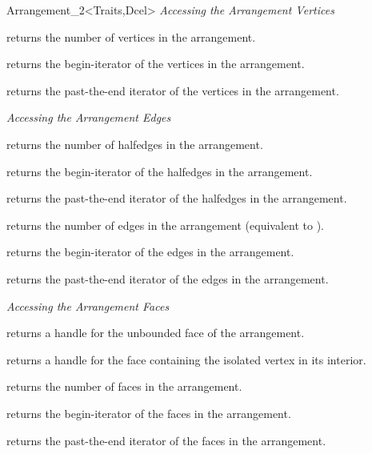\begin{ccRefClass}{Arrangement_2<Traits,Dcel>}
{\sl Accessing the Arrangement Vertices}

    {returns the number of vertices in the arrangement.}

    {returns the begin-iterator of the vertices in the arrangement.}
    
    {returns the past-the-end iterator of the vertices in the arrangement.}

{\sl Accessing the Arrangement Edges}

    {returns the number of halfedges in the arrangement.}

    {returns the begin-iterator of the halfedges in the arrangement.}
 
    {returns the past-the-end iterator of the halfedges in the arrangement.}

    {returns the number of edges in the arrangement (equivalent to
     ).}

    {returns the begin-iterator of the edges in the arrangement.}
 
    {returns the past-the-end iterator of the edges in the arrangement.}

{\sl Accessing the Arrangement Faces}

    {returns a handle for the unbounded face of the arrangement.}

    {returns a handle for the face containing the isolated vertex 
     in its interior.
     }
   
    {returns the number of faces in the arrangement.}

    {returns the begin-iterator of the faces in the arrangement.}
    
    {returns the past-the-end iterator of the faces in the arrangement.}
    


\end{ccRefClass}

